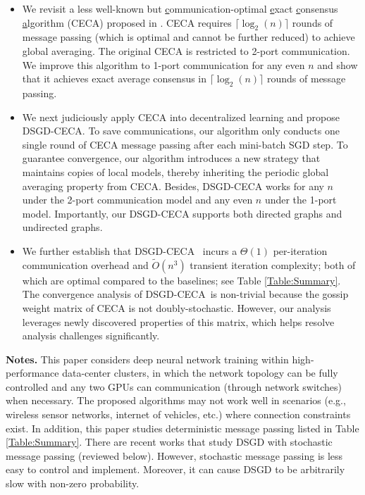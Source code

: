 \documentclass{article}
\theoremstyle{plain}
\theoremstyle{definition}
\begin{document}
\begin{itemize}[leftmargin=10pt]
    \item We revisit a less well-known but \underline{c}ommunication-optimal \underline{e}xact \underline{c}onsensus \underline{a}lgorithm (CECA) proposed in \cite{bar1993optimal}. CECA requires $\lceil\log_2(n)\rceil$ rounds of message passing (which is optimal and cannot be further reduced) to achieve global averaging. {The original CECA is restricted to 2-port communication. We improve this algorithm to 1-port communication for any even $n$ and show that it achieves exact average consensus in $\lceil\log_2(n)\rceil$ rounds of message passing.}
    
    \item We next judiciously apply CECA into decentralized learning and propose DSGD-CECA. 
    To save communications, our algorithm only conducts one single round of CECA message passing after each mini-batch SGD step. 
    To guarantee convergence, our algorithm introduces a new strategy that maintains copies of local models, thereby inheriting the periodic global averaging property from CECA. Besides,
    DSGD-CECA works for any $n$ under the 2-port communication model and any even $n$ under the 1-port model. {Importantly, our DSGD-CECA supports both directed graphs and undirected graphs.}

    \item We further establish that DSGD-CECA \ incurs a $\Theta(1)$ per-iteration communication overhead and $\tilde{O}(n^3)$ transient iteration complexity; both of which are optimal compared to the baselines; see Table \ref{Table:Summary}. The convergence analysis of DSGD-CECA\ is non-trivial because the gossip weight matrix of CECA is not doubly-stochastic. 
    {However, our analysis leverages newly discovered properties of this matrix, which helps resolve analysis challenges significantly.}
\end{itemize}

\textbf{Notes.} This paper considers
deep neural network training within high-performance data-center clusters, in which the network topology can be fully controlled and any two GPUs can communication (through network switches) when necessary. The proposed algorithms may not work well in scenarios (e.g., wireless sensor networks, internet of vehicles, etc.)  where connection constraints exist. In addition, this paper studies deterministic message passing listed in Table \ref{Table:Summary}. There are recent works that study DSGD with stochastic message passing (reviewed below). However, stochastic message passing is less easy to control and implement.
Moreover, it can cause DSGD to be arbitrarily slow with non-zero probability. 
\end{document}
